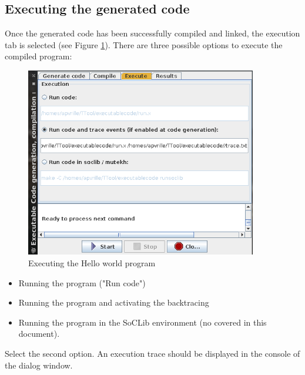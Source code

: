\documentclass[12pt]{article}
\begin{document}
\subsection{Executing the generated code}
Once the generated code has been successfully compiled and linked, the execution tab is selected (see Figure \ref{fig:executehelloworld}). There are three possible options to execute the compiled program:
\begin{figure}[htbp]
\centering
\includegraphics[width=0.9\textwidth]{figures/executehelloworld}
\caption{Executing the Hello world program} \label{fig:executehelloworld}
\end{figure}

\begin{itemize}
\item Running the program ("Run code")
\item Running the program and activating the backtracing
\item Running the program in the SoCLib environment (no covered in this document).
\end{itemize}
Select the second option. An execution trace should be displayed in the console of the dialog window.
\end{document}
